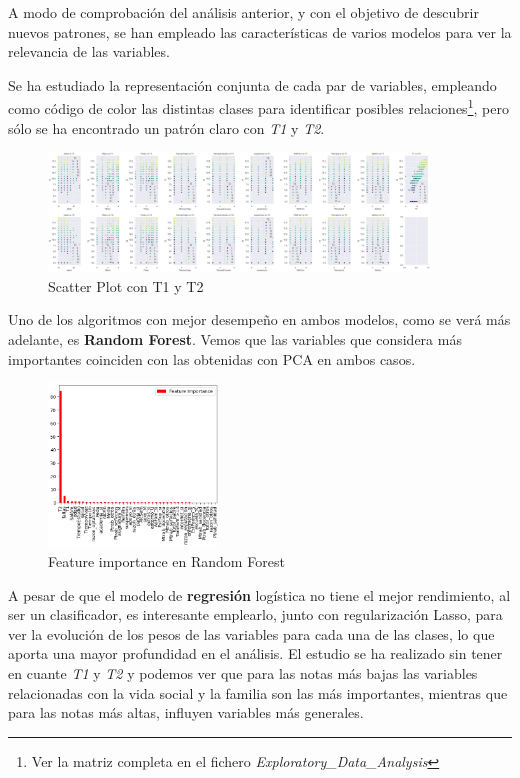 \documentclass{article}
\begin{document}
A modo de comprobación del análisis anterior, y con el objetivo de descubrir nuevos patrones, se han empleado las características de varios modelos para ver la relevancia de las variables.

Se ha estudiado la representación conjunta de cada par de variables, empleando como código de color las distintas clases para identificar posibles relaciones\footnote{Ver la matriz completa en el fichero \textit{Exploratory\_Data\_Analysis}}, pero sólo se ha encontrado un patrón claro con \textit{T1} y \textit{T2}.

\begin{figure}[ht]
  \centering
  \includegraphics[width=0.9\textwidth]{Plot_Var_T1T2.png}
  \caption{Scatter Plot con T1 y T2}\label{fig:scatter}
\end{figure}

Uno de los algoritmos con mejor desempeño en ambos modelos, como se verá más adelante, es \textbf{Random Forest}. Vemos que las variables que considera más importantes coinciden con las obtenidas con PCA en ambos casos.


\begin{figure}[ht]
  \centering
  \includegraphics[width=0.4\textwidth]{RF_var.png}
  \caption{Feature importance en Random Forest}\label{fig:t1t2}
\end{figure}

A pesar de que el modelo de \textbf{regresión} logística no tiene el mejor rendimiento, al ser un clasificador, es interesante emplearlo, junto con regularización Lasso, para ver la evolución de los pesos de las variables para cada una de las clases, lo que aporta una mayor profundidad en el análisis.
El estudio se ha realizado sin tener en cuante \textit{T1} y \textit{T2} y podemos ver que para las notas más bajas las variables relacionadas con la vida social y la familia son las más importantes, mientras que para las notas más altas, influyen variables más generales.
\end{document}
